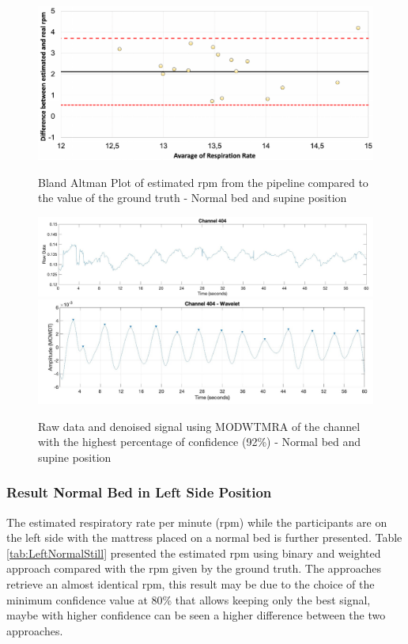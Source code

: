 \begin{figure}[p]
  \centering
  \includegraphics[width=\textwidth]{img/balnd1.pdf}

  \caption{Bland Altman Plot of estimated rpm from the pipeline compared to the value of the ground truth - Normal bed and supine position}
  \label{fig:baln1}
  \vspace{1.5cm}
  \includegraphics[width=\textwidth]{img/404.jpg}
  \includegraphics[width=\textwidth]{img/404_wave.jpg}
\caption{Raw data and denoised signal using MODWTMRA of the channel with the highest percentage of confidence (92\%) - Normal bed and supine position}
  \label{fig:rec}
\end{figure}


\subsubsection{Result Normal Bed in Left Side Position}   \label{cap:ResultNormalBed2}

The estimated respiratory rate per minute (rpm) while the participants are on the left side with the mattress placed on a normal bed is further presented. Table \ref{tab:LeftNormalStill} presented the estimated rpm using binary and weighted approach compared with the rpm given by the ground truth. The approaches retrieve an almost identical rpm, this result may be due to the choice of the minimum confidence value at 80\% that allows keeping only the best signal, maybe with higher confidence can be seen a higher difference between the two approaches. 

